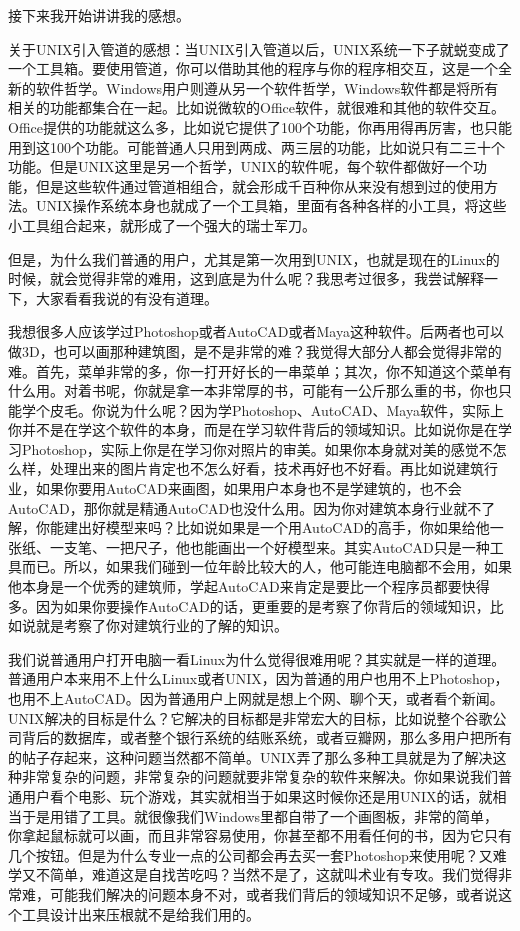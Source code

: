 \documentclass[
  letterpaper,
  DIV=11,
  numbers=noendperiod]{scrreprt}
\begin{document}
接下来我开始讲讲我的感想。

关于UNIX引入管道的感想：当UNIX引入管道以后，UNIX系统一下子就蜕变成了一个工具箱。要使用管道，你可以借助其他的程序与你的程序相交互，这是一个全新的软件哲学。Windows用户则遵从另一个软件哲学，Windows软件都是将所有相关的功能都集合在一起。比如说微软的Office软件，就很难和其他的软件交互。Office提供的功能就这么多，比如说它提供了100个功能，你再用得再厉害，也只能用到这100个功能。可能普通人只用到两成、两三层的功能，比如说只有二三十个功能。但是UNIX这里是另一个哲学，UNIX的软件呢，每个软件都做好一个功能，但是这些软件通过管道相组合，就会形成千百种你从来没有想到过的使用方法。UNIX操作系统本身也就成了一个工具箱，里面有各种各样的小工具，将这些小工具组合起来，就形成了一个强大的瑞士军刀。

但是，为什么我们普通的用户，尤其是第一次用到UNIX，也就是现在的Linux的时候，就会觉得非常的难用，这到底是为什么呢？我思考过很多，我尝试解释一下，大家看看我说的有没有道理。

我想很多人应该学过Photoshop或者AutoCAD或者Maya这种软件。后两者也可以做3D，也可以画那种建筑图，是不是非常的难？我觉得大部分人都会觉得非常的难。首先，菜单非常的多，你一打开好长的一串菜单；其次，你不知道这个菜单有什么用。对着书呢，你就是拿一本非常厚的书，可能有一公斤那么重的书，你也只能学个皮毛。你说为什么呢？因为学Photoshop、AutoCAD、Maya软件，实际上你并不是在学这个软件的本身，而是在学习软件背后的领域知识。比如说你是在学习Photoshop，实际上你是在学习你对照片的审美。如果你本身就对美的感觉不怎么样，处理出来的图片肯定也不怎么好看，技术再好也不好看。再比如说建筑行业，如果你要用AutoCAD来画图，如果用户本身也不是学建筑的，也不会AutoCAD，那你就是精通AutoCAD也没什么用。因为你对建筑本身行业就不了解，你能建出好模型来吗？比如说如果是一个用AutoCAD的高手，你如果给他一张纸、一支笔、一把尺子，他也能画出一个好模型来。其实AutoCAD只是一种工具而已。所以，如果我们碰到一位年龄比较大的人，他可能连电脑都不会用，如果他本身是一个优秀的建筑师，学起AutoCAD来肯定是要比一个程序员都要快得多。因为如果你要操作AutoCAD的话，更重要的是考察了你背后的领域知识，比如说就是考察了你对建筑行业的了解的知识。

我们说普通用户打开电脑一看Linux为什么觉得很难用呢？其实就是一样的道理。普通用户本来用不上什么Linux或者UNIX，因为普通的用户也用不上Photoshop，也用不上AutoCAD。因为普通用户上网就是想上个网、聊个天，或者看个新闻。UNIX解决的目标是什么？它解决的目标都是非常宏大的目标，比如说整个谷歌公司背后的数据库，或者整个银行系统的结账系统，或者豆瓣网，那么多用户把所有的帖子存起来，这种问题当然都不简单。UNIX弄了那么多种工具就是为了解决这种非常复杂的问题，非常复杂的问题就要非常复杂的软件来解决。你如果说我们普通用户看个电影、玩个游戏，其实就相当于如果这时候你还是用UNIX的话，就相当于是用错了工具。就很像我们Windows里都自带了一个画图板，非常的简单，你拿起鼠标就可以画，而且非常容易使用，你甚至都不用看任何的书，因为它只有几个按钮。但是为什么专业一点的公司都会再去买一套Photoshop来使用呢？又难学又不简单，难道这是自找苦吃吗？当然不是了，这就叫术业有专攻。我们觉得非常难，可能我们解决的问题本身不对，或者我们背后的领域知识不足够，或者说这个工具设计出来压根就不是给我们用的。
\end{document}
